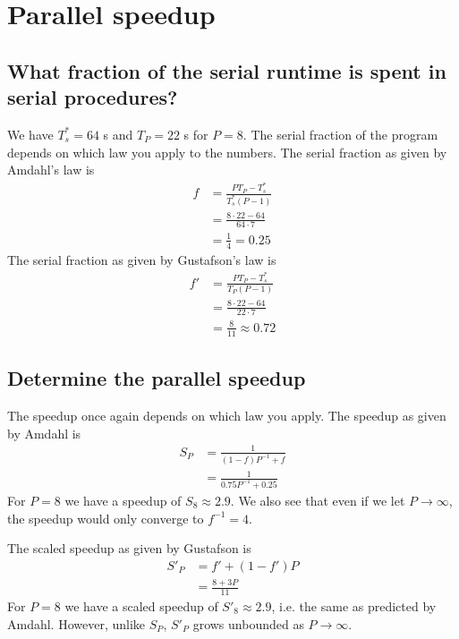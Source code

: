 \documentclass{article}
\begin{document}
\section{Parallel speedup}
\subsection{What fraction of the serial runtime is spent in serial procedures?}
We have $T^*_s = 64$ s and $T_P = 22$ s for $P=8$.
The serial fraction of the program depends on which law you apply to the numbers.
The serial fraction as given by Amdahl's law is
\begin{equation}
  \begin{aligned}
    f
    &= \frac{PT_P - T^*_s}{T^*_s\left( P - 1 \right)} \\
    &= \frac{8\cdot 22 - 64}{64\cdot 7} \\
    &= \frac{1}{4} = 0.25
  \end{aligned}
\end{equation}
The serial fraction as given by Gustafson's law is
\begin{equation}
  \begin{aligned}
    f'
    &= \frac{PT_P - T^*_s}{T_P\left( P - 1 \right)} \\
    &= \frac{8\cdot 22 - 64}{22\cdot 7} \\
    &= \frac{8}{11} \approx 0.72
  \end{aligned}
\end{equation}

\subsection{Determine the parallel speedup}
The speedup once again depends on which law you apply.
The speedup as given by Amdahl is
\begin{equation}
  \begin{aligned}
    S_P
    &= \frac{1}{\left( 1-f \right)P^{-1} + f} \\
    &= \frac{1}{0.75P^{-1} + 0.25}
  \end{aligned}
\end{equation}
For $P=8$ we have a speedup of $S_8 \approx 2.9$.
We also see that even if we let $P\rightarrow\infty$,
the speedup would only converge to $f^{-1} = 4$.

The scaled speedup as given by Gustafson is
\begin{equation}
  \begin{aligned}
    S'_P
    &= f' + (1 - f')P \\
    &= \frac{8 + 3P}{11}
  \end{aligned}
\end{equation}
For $P=8$ we have a scaled speedup of $S'_8 \approx 2.9$,
i.e. the same as predicted by Amdahl.
However, unlike $S_P$, $S'_P$ grows unbounded as $P\rightarrow\infty$.
\end{document}
